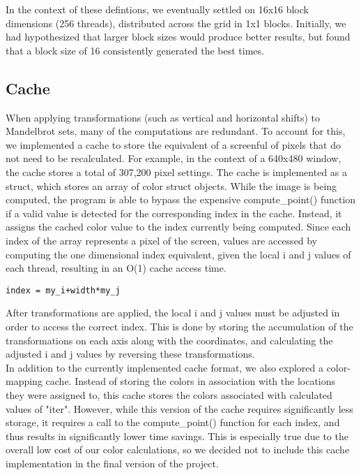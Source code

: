 \documentclass{article}
\begin{document}
In the context of these defintions, we eventually settled on 16x16 block dimensions (256 threads), distributed across the grid in 1x1 blocks.
Initially, we had hypothesized that larger block sizes would produce better results, but found that a block size of 16 consistently generated the best times.

\subsection{Cache}

When applying transformations (such as vertical and horizontal shifts) to Mandelbrot sets, many of the computations are redundant.
To account for this, we implemented a cache to store the equivalent of a screenful of pixels that do not need to be recalculated.
For example, in the context of a 640x480 window, the cache stores a total of 307,200 pixel settings.
The cache is implemented as a struct, which stores an array of color struct objects.
While the image is being computed, the program is able to bypass the expensive compute\_point() function if a valid value is detected for the corresponding index in the cache.
Instead, it assigns the cached color value to the index currently being computed.
Since each index of the array represents a pixel of the screen, values are accessed by computing the one dimensional index equivalent, given the local i and j values of each thread, resulting in an O(1) cache access time.

\begin{verbatim}
index = my_i+width*my_j
\end{verbatim}

After transformations are applied, the local i and j values must be adjusted in order to access the correct index.
This is done by storing the accumulation of the transformations on each axis along with the coordinates, and calculating the adjusted i and j values by reversing these transformations.\\

In addition to the currently implemented cache format, we also explored a color-mapping cache.
Instead of storing the colors in association with the locations they were assigned to, this cache stores the colors associated with calculated values of "iter".
However, while this version of the cache requires significantly less storage, it requires a call to the compute\_point() function for each index, and thus results in significantly lower time savings.
This is especially true due to the overall low cost of our color calculations, so we decided not to include this cache implementation in the final version of the project.
\end{document}
